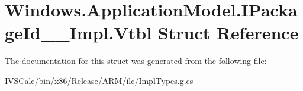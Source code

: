 \hypertarget{struct_windows_1_1_application_model_1_1_i_package_id_____impl_1_1_vtbl}{}\section{Windows.\+Application\+Model.\+I\+Package\+Id\+\_\+\+\_\+\+Impl.\+Vtbl Struct Reference}
\label{struct_windows_1_1_application_model_1_1_i_package_id_____impl_1_1_vtbl}


The documentation for this struct was generated from the following file\+:\begin{DoxyCompactItemize}
\item 
I\+V\+S\+Calc/bin/x86/\+Release/\+A\+R\+M/ilc/Impl\+Types.\+g.\+cs\end{DoxyCompactItemize}
